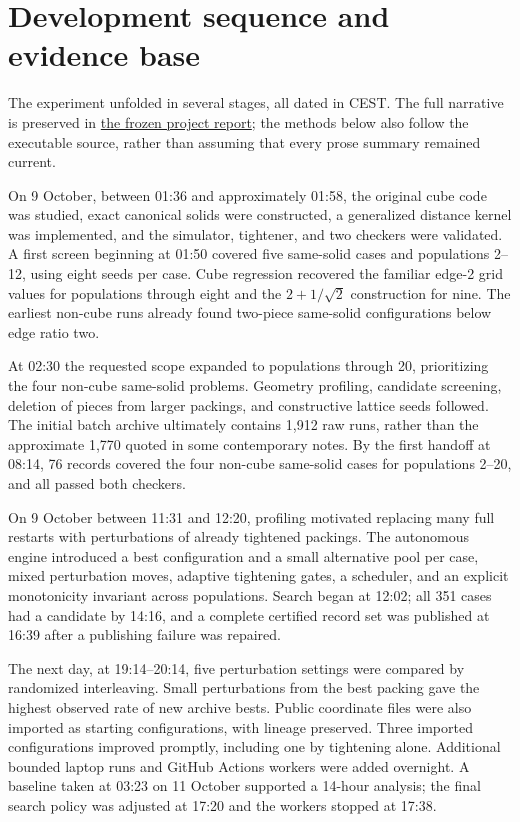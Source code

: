 \documentclass[11pt,a4paper]{article}
\begin{document}
\section{Development sequence and evidence base}

The experiment unfolded in several stages, all dated in CEST. The full narrative is preserved in \href{https://github.com/alejandrozu/platonic-packing/blob/e15b496ae7306287e0e70bb5b14be79f5dfdde84/docs/FINAL\_REPORT.md}{the frozen project report}; the methods below also follow the executable source, rather than assuming that every prose summary remained current.

On 9 October, between 01:36 and approximately 01:58, the original cube code was studied, exact canonical solids were constructed, a generalized distance kernel was implemented, and the simulator, tightener, and two checkers were validated. A first screen beginning at 01:50 covered five same-solid cases and populations 2--12, using eight seeds per case. Cube regression recovered the familiar edge-2 grid values for populations through eight and the \(2+1/\sqrt2\) construction for nine. The earliest non-cube runs already found two-piece same-solid configurations below edge ratio two.

At 02:30 the requested scope expanded to populations through 20, prioritizing the four non-cube same-solid problems. Geometry profiling, candidate screening, deletion of pieces from larger packings, and constructive lattice seeds followed. The initial batch archive ultimately contains 1,912 raw runs, rather than the approximate 1,770 quoted in some contemporary notes. By the first handoff at 08:14, 76 records covered the four non-cube same-solid cases for populations 2--20, and all passed both checkers.

On 9 October between 11:31 and 12:20, profiling motivated replacing many full restarts with perturbations of already tightened packings. The autonomous engine introduced a best configuration and a small alternative pool per case, mixed perturbation moves, adaptive tightening gates, a scheduler, and an explicit monotonicity invariant across populations. Search began at 12:02; all 351 cases had a candidate by 14:16, and a complete certified record set was published at 16:39 after a publishing failure was repaired.

The next day, at 19:14--20:14, five perturbation settings were compared by randomized interleaving. Small perturbations from the best packing gave the highest observed rate of new archive bests. Public coordinate files were also imported as starting configurations, with lineage preserved. Three imported configurations improved promptly, including one by tightening alone. Additional bounded laptop runs and GitHub Actions workers were added overnight. A baseline taken at 03:23 on 11 October supported a 14-hour analysis; the final search policy was adjusted at 17:20 and the workers stopped at 17:38.
\end{document}
